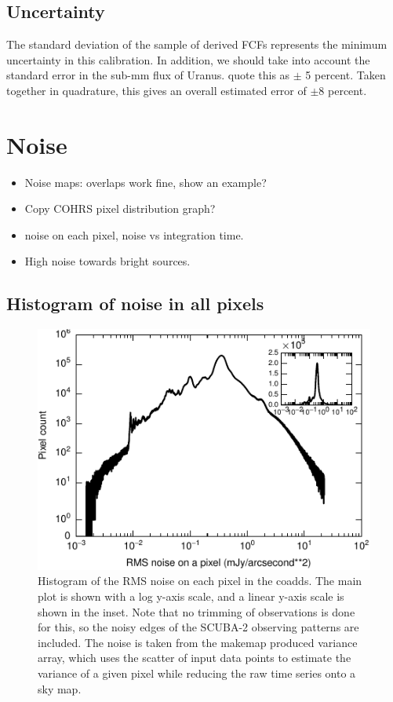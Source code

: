 \documentclass[twocolumn]{aastex6}
\begin{document}
\subsection{Uncertainty}

The standard deviation of the sample of derived FCFs represents the
minimum uncertainty in this calibration. In addition, we should take
into account the standard error in the sub-mm flux of
Uranus. \citet{Dempsey2013} quote this as $\pm$ 5 percent. Taken
together in quadrature, this gives an overall estimated error of
$\pm$8 percent.



\section{Noise}

% 
\begin{itemize}
\item Noise maps: overlaps work fine, show an example? 
\item Copy COHRS pixel distribution graph?
\item noise on each pixel, noise vs integration time.
\item High noise towards bright sources.
\end{itemize}

\subsection{Histogram of noise in all pixels}
\begin{figure}
  \centering
  \includegraphics{coadds-noise-histogram.pdf}
  \caption{Histogram of the RMS noise on each pixel in the coadds. The
    main plot is shown with a log y-axis scale, and a linear y-axis
    scale is shown in the inset. Note that no trimming of observations
    is done for this, so the noisy edges of the SCUBA-2 observing
    patterns are included. The noise is taken from the makemap
    produced variance array, which uses the scatter of input data
    points to estimate the variance of a given pixel while reducing
    the raw time series onto a sky map.}
  \label{fig:histonoise}
\end{figure}
\end{document}
